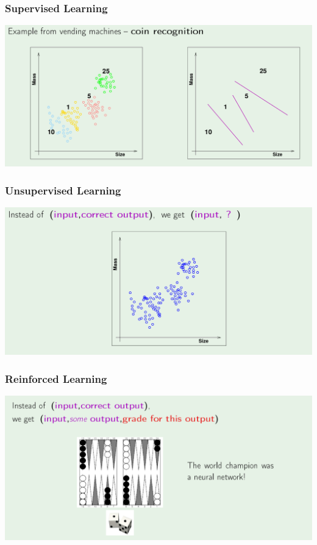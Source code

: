 \documentclass[xcolor=table]{beamer}
\begin{document}
\begin{frame}[t]
\frametitle{Supervised Learning}
\begin{center}
\includegraphics[scale=0.22]{supervised_learning.png}
\end{center}
\end{frame}

\begin{frame}[t]
\frametitle{Unsupervised Learning}
\begin{center}
\includegraphics[scale=0.22]{unsupervised_learning.png}
\end{center}
\end{frame}

\begin{frame}[t]
\frametitle{Reinforced Learning}
\begin{center}
\includegraphics[scale=0.22]{reinforced_learning.png}
\end{center}
\end{frame}
\end{document}
